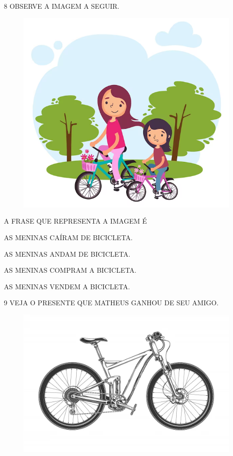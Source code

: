 \num{8} OBSERVE A IMAGEM A SEGUIR.

\begin{figure}[H]
\centering
\includegraphics[width=.6\textwidth]{./media/image241.png}
\end{figure}

A FRASE QUE REPRESENTA A IMAGEM É

\begin{escolha}

\item AS MENINAS CAÍRAM DE BICICLETA.

\item AS MENINAS ANDAM DE BICICLETA.

\item AS MENINAS COMPRAM A BICICLETA.

\item AS MENINAS VENDEM A BICICLETA.

\end{escolha}

\num{9} VEJA O PRESENTE QUE MATHEUS GANHOU DE SEU AMIGO.

\begin{figure}[H]
\centering
\includegraphics[width=.8\textwidth]{./media/image242.png}
\end{figure}


